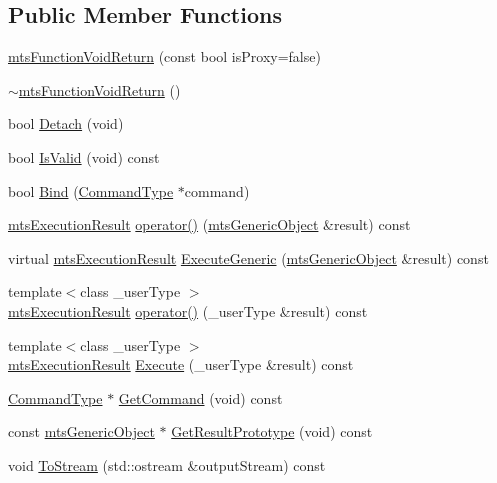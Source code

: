 \subsection*{Public Member Functions}
\begin{DoxyCompactItemize}
\item 
\hyperlink{classmts_function_void_return_ac88980814ca105a13e9e55f2cc58552e}{mts\+Function\+Void\+Return} (const bool is\+Proxy=false)
\item 
\hyperlink{classmts_function_void_return_ab86bbd4fba441a1ff0a722c7206c3e8b}{$\sim$mts\+Function\+Void\+Return} ()
\item 
bool \hyperlink{classmts_function_void_return_ab3bed9416ad22e74a269e1dd0dc07939}{Detach} (void)
\item 
bool \hyperlink{classmts_function_void_return_a179912ed4fd3487b9c274be8db16d822}{Is\+Valid} (void) const 
\item 
bool \hyperlink{classmts_function_void_return_af70fd93635a9e7ef6598f2a942687ab5}{Bind} (\hyperlink{classmts_function_void_return_a8aa3dea44f20057e4f47cbb20de87365}{Command\+Type} $\ast$command)
\item 
\hyperlink{classmts_execution_result}{mts\+Execution\+Result} \hyperlink{classmts_function_void_return_a20cb1b9dd5699e284c833b8d2a3cbca8}{operator()} (\hyperlink{classmts_generic_object}{mts\+Generic\+Object} \&result) const 
\item 
virtual \hyperlink{classmts_execution_result}{mts\+Execution\+Result} \hyperlink{classmts_function_void_return_a326e9b07fe307efd929ca04acf624459}{Execute\+Generic} (\hyperlink{classmts_generic_object}{mts\+Generic\+Object} \&result) const 
\item 
{\footnotesize template$<$class \+\_\+user\+Type $>$ }\\\hyperlink{classmts_execution_result}{mts\+Execution\+Result} \hyperlink{classmts_function_void_return_a96e91f6c4e5c36bc1e5b2c9ccb6dce07}{operator()} (\+\_\+user\+Type \&result) const 
\item 
{\footnotesize template$<$class \+\_\+user\+Type $>$ }\\\hyperlink{classmts_execution_result}{mts\+Execution\+Result} \hyperlink{classmts_function_void_return_a4c0db584b129d6306efa05f9ee54c2bb}{Execute} (\+\_\+user\+Type \&result) const 
\item 
\hyperlink{classmts_function_void_return_a8aa3dea44f20057e4f47cbb20de87365}{Command\+Type} $\ast$ \hyperlink{classmts_function_void_return_a8287972a864682bc1b94353ec747afc5}{Get\+Command} (void) const 
\item 
const \hyperlink{classmts_generic_object}{mts\+Generic\+Object} $\ast$ \hyperlink{classmts_function_void_return_acf66115c744df69c96b04f1c8c1c1d36}{Get\+Result\+Prototype} (void) const 
\item 
void \hyperlink{classmts_function_void_return_a7ed10b567427fe11d5b10cbb17f5e4fc}{To\+Stream} (std\+::ostream \&output\+Stream) const 
\end{DoxyCompactItemize}
